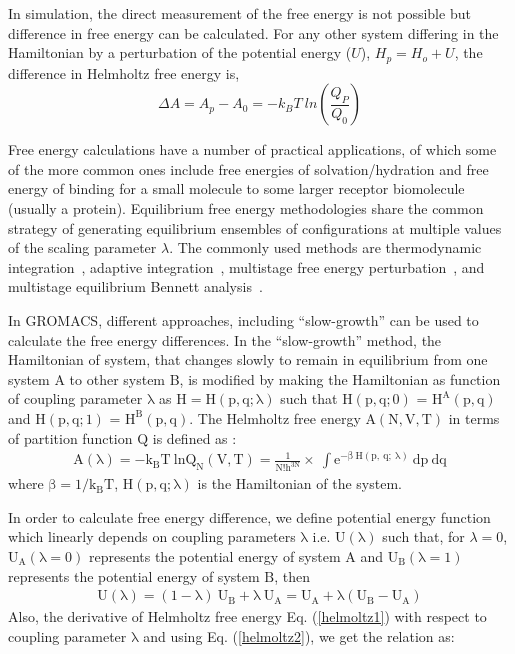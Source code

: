       In simulation, the direct measurement of the free energy is not possible but difference in free energy can be calculated. For any other system differing in the Hamiltonian by a perturbation of the potential energy ($U$),  $H_p = H_o +  U$, the difference in Helmholtz free energy is, 
     \begin{equation}
     \Delta A = A_p -A_0 = -k_BT~ ln \left(\frac{Q_P}{Q_0}  \right) 
     \end{equation}
     
  Free energy calculations have a number of practical applications, of which some of the more common
  ones include free energies of solvation/hydration and free energy of binding for a small molecule to some larger receptor biomolecule (usually a protein). Equilibrium free energy methodologies share the common strategy of generating equilibrium ensembles of configurations at multiple values of the scaling parameter $\lambda$. The commonly used methods are   thermodynamic  integration~\citep{kirkwood1935}, adaptive integration~\citep{fasnacht2004}, multistage free energy perturbation~\citep{zwanzig1954}, and multistage equilibrium Bennett analysis~\citep{bennett1976}.
  
   In GROMACS, different approaches, including ``slow-growth'' can be used to calculate the free energy differences. In the ``slow-growth'' method, the Hamiltonian of system, that changes slowly to remain in equilibrium from one system A to other system B, is modified  by making the Hamiltonian as function of coupling parameter $\mathrm{\lambda}$ as $\mathrm{H= H(p, q; \lambda)}$ such that
    $\mathrm{H(p, q; 0)}$ = $\mathrm{H^{A}(p, q)}$ and
    $\mathrm{H(p, q; 1)}$ = $\mathrm{H^{B}(p, q)}$. The Helmholtz free energy $\mathrm{A (N, V, T)}$ in terms of partition function $\mathrm{Q}$ is defined as
   \citep{huang2009, pathria1996, Gromacs-manual}:
   \begin{eqnarray}
   \mathrm{A (\lambda) = -k_B T~ ln Q_N(V,T)}  =\mathrm{\frac{1}{N!h^{3N}}}
    \times\mathrm{\ \int e^{-\beta~H(p,~q;~\lambda)}~dp~dq}
     \label{helmoltz1}
       \end{eqnarray}
   where $\mathrm{\beta = 1/k_BT}$, $\mathrm{H(p, q; \lambda)}$ is the Hamiltonian of the system.
   
   In order to calculate free energy difference, we define potential energy function which linearly depends on coupling parameters $\mathrm{\lambda}$ i.e. $\mathrm{U(\lambda)}$ such that, for $\lambda = 0$, $\mathrm{U_{A}(\lambda=0)}$ represents the potential energy of system $\mathrm{A}$ and $\mathrm{U_{B}(\lambda=1)}$ represents the potential energy of system $\mathrm{B}$, then 
   \begin{eqnarray}
   \mathrm{U(\lambda)}=\mathrm{(1-\lambda)~U_{B}} + \mathrm{\lambda~U_{A}} =\mathrm{U_{A}}+ \mathrm{\lambda(U_{B} - U_{A})} 
    \label{helmoltz2}
   \end{eqnarray}
   Also, the derivative of Helmholtz free energy Eq. (\ref{helmoltz1})  with respect to coupling parameter $\mathrm{\lambda}$ and using  Eq. (\ref{helmoltz2}), we get the relation as:
   
